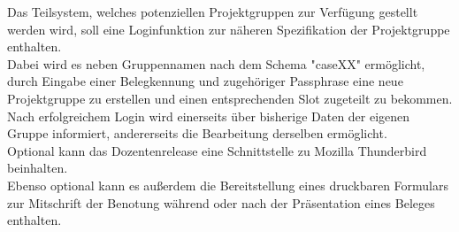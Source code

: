 \documentclass{article}
\begin{document}
Das Teilsystem, welches potenziellen Projektgruppen zur Verfügung gestellt werden wird, soll eine Loginfunktion zur näheren Spezifikation der Projektgruppe enthalten.\\
Dabei wird es neben Gruppennamen nach dem Schema "caseXX" ermöglicht, durch Eingabe einer Belegkennung und zugehöriger Passphrase eine neue Projektgruppe zu erstellen und einen entsprechenden Slot zugeteilt zu bekommen.\\
Nach erfolgreichem Login wird einerseits über bisherige Daten der eigenen Gruppe informiert, andererseits die Bearbeitung derselben ermöglicht.\\

Optional kann das Dozentenrelease eine Schnittstelle zu Mozilla Thunderbird beinhalten.\\
Ebenso optional kann es außerdem die Bereitstellung eines druckbaren Formulars zur Mitschrift der Benotung während oder nach der Präsentation eines Beleges enthalten.\\
\end{document}
